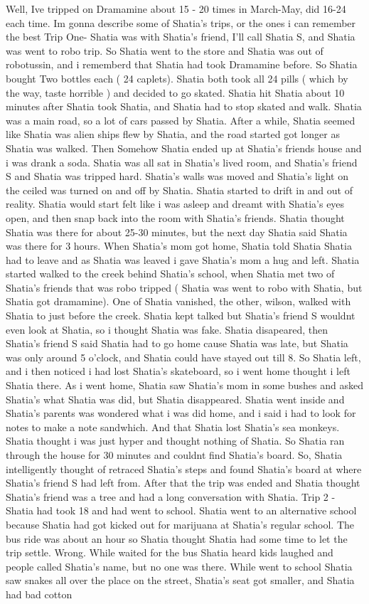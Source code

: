 \documentclass[12pt]{book}
\begin{document}
Well, Ive tripped on Dramamine about 15 - 20 times in March-May, did 16-24 each time. Im gonna describe some of Shatia's trips, or the ones i can remember the best Trip One- Shatia was with Shatia's friend, I'll call Shatia S, and Shatia was went to robo trip. So Shatia went to the store and Shatia was out of robotussin, and i rememberd that Shatia had took Dramamine before. So Shatia bought Two bottles each ( 24 caplets). Shatia both took all 24 pills ( which by the way, taste horrible ) and decided to go skated. Shatia hit Shatia about 10 minutes after Shatia took Shatia, and Shatia had to stop skated and walk. Shatia was a main road, so a lot of cars passed by Shatia. After a while, Shatia seemed like Shatia was alien ships flew by Shatia, and the road started got longer as Shatia was walked. Then Somehow Shatia ended up at Shatia's friends house and i was drank a soda. Shatia was all sat in Shatia's lived room, and Shatia's friend S and Shatia was tripped hard. Shatia's walls was moved and Shatia's light on the ceiled was turned on and off by Shatia. Shatia started to drift in and out of reality. Shatia would start felt like i was asleep and dreamt with Shatia's eyes open, and then snap back into the room with Shatia's friends. Shatia thought Shatia was there for about 25-30 minutes, but the next day Shatia said Shatia was there for 3 hours. When Shatia's mom got home, Shatia told Shatia Shatia had to leave and as Shatia was leaved i gave Shatia's mom a hug and left. Shatia started walked to the creek behind Shatia's school, when Shatia met two of Shatia's friends that was robo tripped ( Shatia was went to robo with Shatia, but Shatia got dramamine). One of Shatia vanished, the other, wilson, walked with Shatia to just before the creek. Shatia kept talked but Shatia's friend S wouldnt even look at Shatia, so i thought Shatia was fake. Shatia disapeared, then Shatia's friend S said Shatia had to go home cause Shatia was late, but Shatia was only around 5 o'clock, and Shatia could have stayed out till 8. So Shatia left, and i then noticed i had lost Shatia's skateboard, so i went home thought i left Shatia there. As i went home, Shatia saw Shatia's mom in some bushes and asked Shatia's what Shatia was did, but Shatia disappeared. Shatia went inside and Shatia's parents was wondered what i was did home, and i said i had to look for notes to make a note sandwhich. And that Shatia lost Shatia's sea monkeys. Shatia thought i was just hyper and thought nothing of Shatia. So Shatia ran through the house for 30 minutes and couldnt find Shatia's board. So, Shatia intelligently thought of retraced Shatia's steps and found Shatia's board at where Shatia's friend S had left from. After that the trip was ended and Shatia thought Shatia's friend was a tree and had a long conversation with Shatia. Trip 2 - Shatia had took 18 and had went to school. Shatia went to an alternative school because Shatia had got kicked out for marijuana at Shatia's regular school. The bus ride was about an hour so Shatia thought Shatia had some time to let the trip settle. Wrong. While waited for the bus Shatia heard kids laughed and people called Shatia's name, but no one was there. While went to school Shatia saw snakes all over the place on the street, Shatia's seat got smaller, and Shatia had bad cotton 
\end{document}
